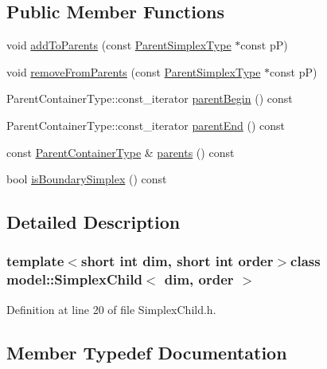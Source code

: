 \subsection*{Public Member Functions}
\begin{DoxyCompactItemize}
\item 
void \hyperlink{classmodel_1_1_simplex_child_a62129b2a4a8d45d45653e9a7f9eb263a}{add\+To\+Parents} (const \hyperlink{classmodel_1_1_simplex_child_aa1c2795f491c9cd9dc6edd46acc9850c}{Parent\+Simplex\+Type} $\ast$const p\+P)
\item 
void \hyperlink{classmodel_1_1_simplex_child_a17fd2a4e27f86da573e95d789573d0d8}{remove\+From\+Parents} (const \hyperlink{classmodel_1_1_simplex_child_aa1c2795f491c9cd9dc6edd46acc9850c}{Parent\+Simplex\+Type} $\ast$const p\+P)
\item 
Parent\+Container\+Type\+::const\+\_\+iterator \hyperlink{classmodel_1_1_simplex_child_a816e3baffb65f4bb2f43de1a016c76aa}{parent\+Begin} () const 
\item 
Parent\+Container\+Type\+::const\+\_\+iterator \hyperlink{classmodel_1_1_simplex_child_a43868f6512ebb6e478ad884216b03450}{parent\+End} () const 
\item 
const \hyperlink{classmodel_1_1_simplex_child_aad7e4820d7c2450bbf9c328ba68d2bd7}{Parent\+Container\+Type} \& \hyperlink{classmodel_1_1_simplex_child_aaef6b9d50bfeeb2c831128a7a871bae0}{parents} () const 
\item 
bool \hyperlink{classmodel_1_1_simplex_child_aa48d1d02c3d2c61db058c777677c2809}{is\+Boundary\+Simplex} () const 
\end{DoxyCompactItemize}


\subsection{Detailed Description}
\subsubsection*{template$<$short int dim, short int order$>$class model\+::\+Simplex\+Child$<$ dim, order $>$}



Definition at line 20 of file Simplex\+Child.\+h.



\subsection{Member Typedef Documentation}
\hypertarget{classmodel_1_1_simplex_child_aad7e4820d7c2450bbf9c328ba68d2bd7}{}
